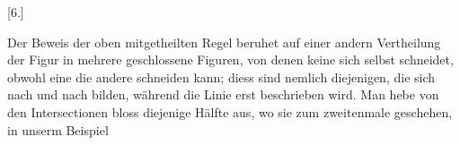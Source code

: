 \begin{center}[6.]\end{center}

Der Beweis der oben mitgetheilten Regel beruhet auf einer andern Vertheilung
der Figur in mehrere geschlossene Figuren, von denen keine sich selbst
schneidet, obwohl eine die andere schneiden kann; diess sind nemlich
diejenigen, die sich nach und nach bilden, während die Linie erst beschrieben
wird. Man hebe von den Intersectionen bloss diejenige Hälfte aus, wo sie
zum zweitenmale geschehen, in unserm Beispiel
